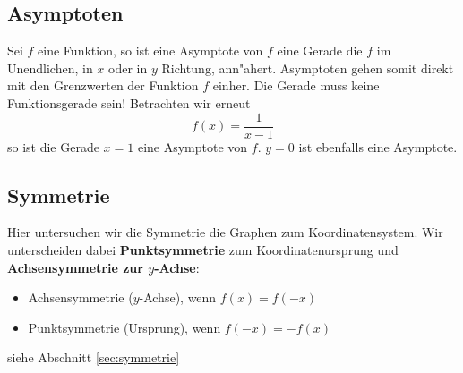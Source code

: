 \subsection{Asymptoten}
Sei $f$ eine Funktion, so ist eine Asymptote von $f$ eine Gerade die $f$ im Unendlichen, in $x$ oder in $y$ Richtung, ann"ahert. Asymptoten gehen somit direkt mit den Grenzwerten der Funktion $f$ einher. Die Gerade muss keine Funktionsgerade sein! Betrachten wir erneut 
\begin{equation*}
f(x) = \frac{1}{x-1}
\end{equation*}
so ist die Gerade $x=1$ eine Asymptote von $f$. $y=0$ ist ebenfalls eine Asymptote.

 \subsection{Symmetrie}
 Hier untersuchen wir die Symmetrie die Graphen zum Koordinatensystem. Wir unterscheiden dabei \textbf{Punktsymmetrie} zum Koordinatenursprung und \textbf{Achsensymmetrie zur $y$-Achse}:
 \begin{itemize}
 \item Achsensymmetrie ($y$-Achse), wenn $f(x)=f(-x)$
 \item Punktsymmetrie (Ursprung), wenn $f(-x)=-f(x)$
 \end{itemize}
 siehe Abschnitt \ref{sec:symmetrie}

